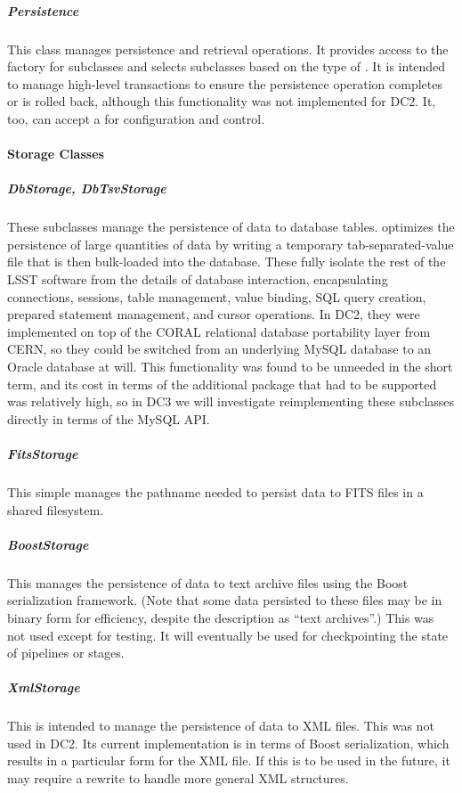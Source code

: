 \subparagraph{Persistence}
This class manages persistence and retrieval operations.  It provides
access to the factory for  subclasses and selects 
subclasses based on the type of .  It is intended to manage
high-level transactions to ensure the persistence operation completes or
is rolled back, although this functionality was not implemented for DC2.
It, too, can accept a  for configuration and control.

\paragraph{Storage Classes}
\label{Storages}

\subparagraph{DbStorage, DbTsvStorage}
These  subclasses manage the persistence of data to database
tables.   optimizes the persistence of large quantities of
data by writing a temporary tab-separated-value file that is then
bulk-loaded into the database.  These  fully isolate the rest of
the LSST software from the details of database interaction,
encapsulating connections, sessions, table management, value binding,
SQL query creation, prepared statement management, and cursor
operations.  In DC2, they were implemented on top of the CORAL
relational database portability layer from CERN, so they could be
switched from an underlying MySQL database to an Oracle database at
will.  This functionality was found to be unneeded in the short term,
and its cost in terms of the additional package that had to be supported
was relatively high, so in DC3 we will investigate reimplementing these
subclasses directly in terms of the MySQL API.

\subparagraph{FitsStorage}
This simple  manages the pathname needed to persist data to FITS
files in a shared filesystem.

\subparagraph{BoostStorage}
This  manages the persistence of data to text archive files using
the Boost serialization framework.  (Note that some data persisted to
these files may be in binary form for efficiency, despite the
description as ``text archives''.) This  was not used except for
testing.  It will eventually be used for checkpointing the state of
pipelines or stages.

\subparagraph{XmlStorage}
This  is intended to manage the persistence of data to XML files.
This  was not used in DC2.  Its current implementation is in
terms of Boost serialization, which results in a particular form for the
XML file.  If this  is to be used in the future, it may require a
rewrite to handle more general XML structures.

